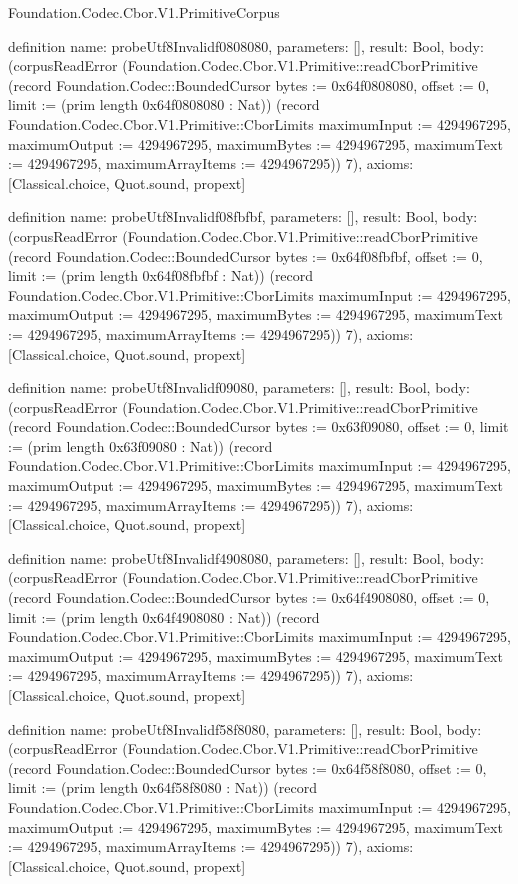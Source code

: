 \begin{lexlean}{Foundation.Codec.Cbor.V1.PrimitiveCorpus}
\begin{semanticmodule}
definition{
  name: probeUtf8Invalidf0808080,
  parameters: [],
  result: Bool,
  body: (corpusReadError (Foundation.Codec.Cbor.V1.Primitive::readCborPrimitive (record Foundation.Codec::BoundedCursor {bytes := 0x64f0808080, offset := 0, limit := (prim length 0x64f0808080 : Nat)}) (record Foundation.Codec.Cbor.V1.Primitive::CborLimits {maximumInput := 4294967295, maximumOutput := 4294967295, maximumBytes := 4294967295, maximumText := 4294967295, maximumArrayItems := 4294967295})) 7),
  axioms: [Classical.choice, Quot.sound, propext]
}

definition{
  name: probeUtf8Invalidf08fbfbf,
  parameters: [],
  result: Bool,
  body: (corpusReadError (Foundation.Codec.Cbor.V1.Primitive::readCborPrimitive (record Foundation.Codec::BoundedCursor {bytes := 0x64f08fbfbf, offset := 0, limit := (prim length 0x64f08fbfbf : Nat)}) (record Foundation.Codec.Cbor.V1.Primitive::CborLimits {maximumInput := 4294967295, maximumOutput := 4294967295, maximumBytes := 4294967295, maximumText := 4294967295, maximumArrayItems := 4294967295})) 7),
  axioms: [Classical.choice, Quot.sound, propext]
}

definition{
  name: probeUtf8Invalidf09080,
  parameters: [],
  result: Bool,
  body: (corpusReadError (Foundation.Codec.Cbor.V1.Primitive::readCborPrimitive (record Foundation.Codec::BoundedCursor {bytes := 0x63f09080, offset := 0, limit := (prim length 0x63f09080 : Nat)}) (record Foundation.Codec.Cbor.V1.Primitive::CborLimits {maximumInput := 4294967295, maximumOutput := 4294967295, maximumBytes := 4294967295, maximumText := 4294967295, maximumArrayItems := 4294967295})) 7),
  axioms: [Classical.choice, Quot.sound, propext]
}

definition{
  name: probeUtf8Invalidf4908080,
  parameters: [],
  result: Bool,
  body: (corpusReadError (Foundation.Codec.Cbor.V1.Primitive::readCborPrimitive (record Foundation.Codec::BoundedCursor {bytes := 0x64f4908080, offset := 0, limit := (prim length 0x64f4908080 : Nat)}) (record Foundation.Codec.Cbor.V1.Primitive::CborLimits {maximumInput := 4294967295, maximumOutput := 4294967295, maximumBytes := 4294967295, maximumText := 4294967295, maximumArrayItems := 4294967295})) 7),
  axioms: [Classical.choice, Quot.sound, propext]
}

definition{
  name: probeUtf8Invalidf58f8080,
  parameters: [],
  result: Bool,
  body: (corpusReadError (Foundation.Codec.Cbor.V1.Primitive::readCborPrimitive (record Foundation.Codec::BoundedCursor {bytes := 0x64f58f8080, offset := 0, limit := (prim length 0x64f58f8080 : Nat)}) (record Foundation.Codec.Cbor.V1.Primitive::CborLimits {maximumInput := 4294967295, maximumOutput := 4294967295, maximumBytes := 4294967295, maximumText := 4294967295, maximumArrayItems := 4294967295})) 7),
  axioms: [Classical.choice, Quot.sound, propext]
}


\end{semanticmodule}
\end{lexlean}
